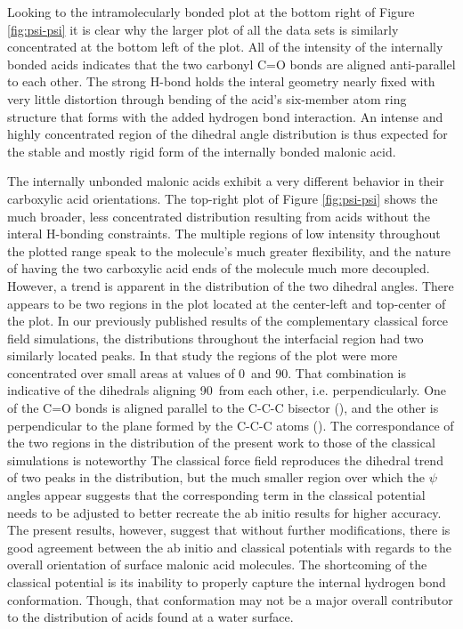 Looking to the intramolecularly bonded plot at the bottom right of Figure \ref{fig:psi-psi} it is clear why the larger plot of all the data sets is similarly concentrated at the bottom left of the plot. All of the intensity of the internally bonded acids indicates that the two carbonyl C=O bonds are aligned anti-parallel to each other. The strong H-bond holds the interal geometry nearly fixed with very little distortion through bending of the acid's six-member atom ring structure that forms with the added hydrogen bond interaction. An intense and highly concentrated region of the dihedral angle distribution is thus expected for the stable and mostly rigid form of the internally bonded malonic acid.

The internally unbonded malonic acids exhibit a very different behavior in their carboxylic acid orientations. The top-right plot of Figure \ref{fig:psi-psi} shows the much broader, less concentrated distribution resulting from acids without the interal H-bonding constraints. The multiple regions of low intensity throughout the plotted range speak to the molecule's much greater flexibility, and the nature of having the two carboxylic acid ends of the molecule much more decoupled. However, a trend is apparent in the distribution of the two dihedral angles. There appears to be two regions in the plot located at the center-left and top-center of the plot. In our previously published results of the complementary classical force field simulations,\cite{Blower2012} the \psipsi distributions throughout the interfacial region had two similarly located peaks. In that study the regions of the plot were more concentrated over small areas at \psipsi values of 0\degr~and 90\degr. That combination is indicative of the dihedrals aligning 90\degr~from each other, i.e. perpendicularly. One of the C=O bonds is aligned parallel to the C-C-C bisector (\degr), and the other is perpendicular to the plane formed by the C-C-C atoms (\degr). The correspondance of the two regions in the distribution of the present work to those of the classical simulations is noteworthy The classical force field reproduces the dihedral trend of two peaks in the distribution, but the much smaller region over which the $\psi$ angles appear suggests that the corresponding term in the classical potential needs to be adjusted to better recreate the ab initio results for higher accuracy. The present results, however, suggest that without further modifications, there is good agreement between the ab initio and classical potentials with regards to the overall orientation of surface malonic acid molecules. The shortcoming of the classical potential is its inability to properly capture the internal hydrogen bond conformation. Though, that conformation may not be a major overall contributor to the distribution of acids found at a water surface.

